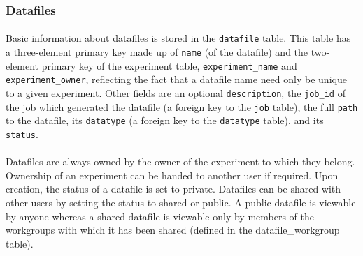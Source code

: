 \subsubsection{Datafiles}
\label{sec:model_datafiles}

\paragraph{}
Basic information about datafiles is stored in the \texttt{datafile} table. This table has a three-element primary key made up of \texttt{name} (of the datafile) and the two-element primary key of the experiment table, \texttt{experiment\_name} and \texttt{experiment\_owner}, reflecting the fact that a datafile name need only be unique to a given experiment. Other fields are an optional \texttt{description}, the \texttt{job\_id} of the job which generated the datafile (a foreign key to the \texttt{job} table), the full \texttt{path} to the datafile, its \texttt{datatype} (a foreign key to the \texttt{datatype} table), and its \texttt{status}. 


\paragraph{}
Datafiles are always owned by the owner of the experiment to which they belong. Ownership of an experiment can be handed to another user if required. Upon creation, the status of a datafile is set to private. Datafiles can be shared with other users by setting the status to shared or public. A public datafile is viewable by anyone whereas a shared datafile is viewable only by members of the workgroups with which it has been shared (defined in the datafile\_workgroup table).

